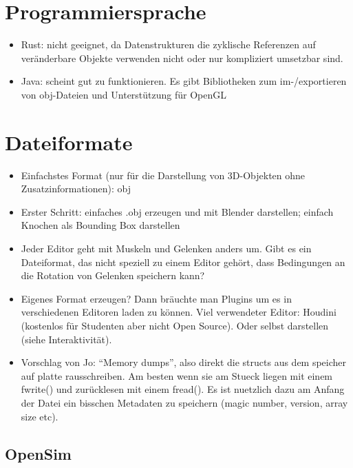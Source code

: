 \section{Programmiersprache}

\begin{itemize}
 \item Rust: nicht geeignet, da Datenstrukturen die zyklische Referenzen auf veränderbare Objekte verwenden nicht oder nur kompliziert umsetzbar sind.
 \item Java: scheint gut zu funktionieren. Es gibt Bibliotheken zum im-/exportieren von obj-Dateien und Unterstützung für OpenGL
\end{itemize}


\section{Dateiformate}

\begin{itemize}
 \item Einfachstes Format (nur für die Darstellung von 3D-Objekten ohne Zusatzinformationen): obj
 \item Erster Schritt: einfaches .obj erzeugen und mit Blender darstellen; einfach Knochen als Bounding Box darstellen
 \item Jeder Editor geht mit Muskeln und Gelenken anders um. Gibt es ein Dateiformat, das nicht speziell zu einem Editor gehört, dass Bedingungen an die Rotation von Gelenken speichern kann?
 \item Eigenes Format erzeugen? Dann bräuchte man Plugins um es in verschiedenen Editoren laden zu können. Viel verwendeter Editor: Houdini (kostenlos für Studenten aber nicht Open Source). Oder selbst darstellen (siehe Interaktivität).
\item Vorschlag von Jo: "`Memory dumps"', also direkt die structs aus dem speicher auf platte rausschreiben. Am besten wenn sie am Stueck liegen mit einem fwrite() und zurücklesen mit einem fread(). Es ist nuetzlich dazu am Anfang der Datei ein bisschen Metadaten zu speichern (magic number, version, array size etc).
\end{itemize}

\subsection{OpenSim}

